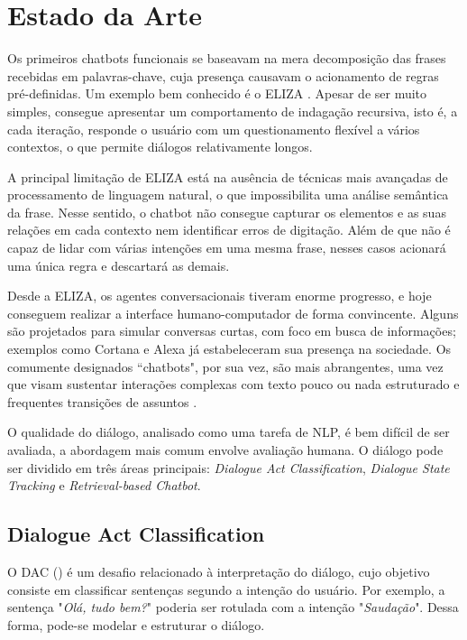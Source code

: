 \documentclass[]{politex}
\begin{document}
\section{Estado da Arte}

Os primeiros chatbots funcionais se baseavam na mera decomposição das frases recebidas em palavras-chave, cuja presença causavam o acionamento de regras pré-definidas. Um exemplo bem conhecido é o ELIZA \cite{Weizenbaum:1966:ECP:365153.365168}. Apesar de ser muito simples, consegue apresentar um comportamento de indagação recursiva, isto é, a cada iteração, responde o usuário com um questionamento flexível a vários contextos, o que permite diálogos relativamente longos. 

A principal limitação de ELIZA está na ausência de técnicas mais avançadas de processamento de linguagem natural, o que impossibilita uma análise semântica da frase. Nesse sentido, o chatbot não consegue capturar os elementos e as suas relações em cada contexto nem identificar erros de digitação. Além de que não é capaz de lidar com várias intenções em uma mesma frase, nesses casos acionará uma única regra e descartará as demais.

Desde a ELIZA, os agentes conversacionais tiveram enorme progresso, e hoje conseguem realizar a interface humano-computador de forma convincente. Alguns são projetados para simular conversas curtas, com foco em busca de informações; exemplos como Cortana e Alexa já estabeleceram sua presença na sociedade. Os comumente designados ``chatbots", por sua vez, são mais abrangentes, uma vez que visam sustentar interações complexas com texto pouco ou nada estruturado e frequentes transições de assuntos \cite{Bollacker:2008:FCC:1376616.1376746}. 

O qualidade do diálogo, analisado como uma tarefa de NLP, é bem difícil de ser avaliada, a abordagem mais comum envolve avaliação humana. O diálogo pode ser dividido em três áreas principais: \textit{Dialogue Act Classification}, \textit{Dialogue State Tracking} e \textit{Retrieval-based Chatbot}.

\subsection{Dialogue Act Classification}

O DAC () é um desafio relacionado à interpretação do diálogo, cujo objetivo consiste em classificar sentenças segundo a intenção do usuário. Por exemplo, a sentença "\textit{Olá, tudo bem?}" poderia ser rotulada com a intenção "\textit{Saudação}". Dessa forma, pode-se modelar e estruturar o diálogo. 
\end{document}
